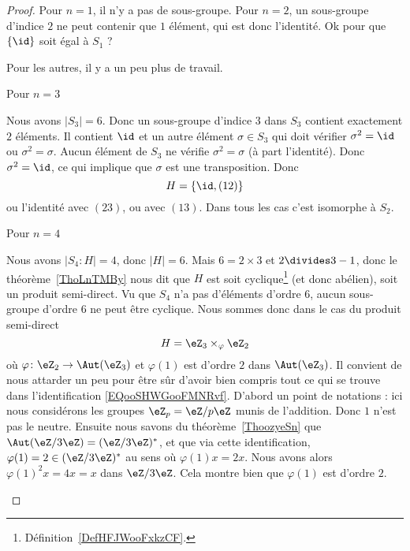 \begin{proof}
    Pour \( n=1\), il n'y a pas de sous-groupe. Pour \( n=2\), un sous-groupe d'indice \( 2\) ne peut contenir que \( 1\) élément, qui est donc l'identité. Ok pour que \( \{ \id \}\) soit égal à \( S_1\) ?

    Pour les autres, il y a un peu plus de travail.

    \begin{subproof}
        \item[Pour \( n=3\)]

            Nous avons \( | S_3 |=6\). Donc un sous-groupe d'indice $3$ dans \( S_3\) contient exactement \( 2\) éléments. Il contient \( \id\) et un autre élément \( \sigma\in S_3\) qui doit vérifier \( \sigma^2=\id\) ou \( \sigma^2=\sigma\). Aucun élément de \( S_3\) ne vérifie \( \sigma^2=\sigma\) (à part l'identité). Donc \( \sigma^2=\id\), ce qui implique que \( \sigma\) est une transposition. Donc
            \begin{equation}
                H=\{ \id,(12) \}
            \end{equation}
            ou l'identité avec \( (23)\), ou avec \( (13)\). Dans tous les cas c'est isomorphe à \( S_2\).

        \item[Pour \( n=4\)]

            Nous avons \( | S_4:H |=4\), donc \( | H |=6\). Mais \( 6=2\times 3\) et \( 2\divides 3-1\), donc le théorème~\ref{ThoLnTMBy} nous dit que \( H\) est soit cyclique\footnote{Définition~\ref{DefHFJWooFxkzCF}.} (et donc abélien), soit un produit semi-direct. Vu que \( S_4\) n'a pas d'éléments d'ordre $6$, aucun sous-groupe d'ordre \( 6\) ne peut être cyclique. Nous sommes donc dans le cas du produit semi-direct
            \begin{equation}        \label{EQooSHWGooFMNRvf}
                H=\eZ_3\times_{\varphi}\eZ_2
            \end{equation}
            où \( \varphi\colon \eZ_2\to \Aut(\eZ_3)\) et \( \varphi(1)\) est d'ordre \( 2\) dans \( \Aut(\eZ_3)\). Il convient de nous attarder un peu pour être sûr d'avoir bien compris tout ce qui se trouve dans l'identification \eqref{EQooSHWGooFMNRvf}. D'abord un point de notations : ici nous considérons les groupes \( \eZ_p=\eZ/p\eZ\) munis de l'addition. Donc \( 1\) n'est pas le neutre. Ensuite nous savons du théorème~\ref{ThoozyeSn} que \( \Aut(\eZ/3\eZ)=(\eZ/3\eZ)^*\), et que via cette identification, \( \varphi(1)=2\in(\eZ/3\eZ)^*\) au sens où \( \varphi(1)x=2x\). Nous avons alors \( \varphi(1)^2x=4x=x\) dans \( \eZ/3\eZ\). Cela montre bien que \( \varphi(1)\) est d'ordre \( 2\).


\end{subproof}
\end{proof}
